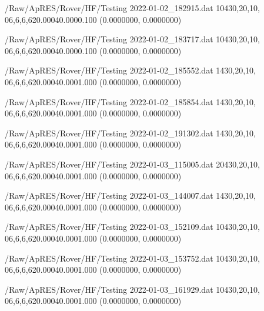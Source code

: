 \hfaprestable
{/Raw/ApRES/Rover/HF/Testing}%
{2022-01-02\_182915.dat}%
{10}{4}{30,20,10, 0}{6,6,6,6}{20.000}{40.000}{0.100}%
{ (0.0000000, 0.0000000)}%
{}%
{}%

\hfaprestable
{/Raw/ApRES/Rover/HF/Testing}%
{2022-01-02\_183717.dat}%
{10}{4}{30,20,10, 0}{6,6,6,6}{20.000}{40.000}{0.100}%
{ (0.0000000, 0.0000000)}%
{}%
{}%

\hfaprestable
{/Raw/ApRES/Rover/HF/Testing}%
{2022-01-02\_185552.dat}%
{1}{4}{30,20,10, 0}{6,6,6,6}{20.000}{40.000}{1.000}%
{ (0.0000000, 0.0000000)}%
{}%
{}%

\hfaprestable
{/Raw/ApRES/Rover/HF/Testing}%
{2022-01-02\_185854.dat}%
{1}{4}{30,20,10, 0}{6,6,6,6}{20.000}{40.000}{1.000}%
{ (0.0000000, 0.0000000)}%
{}%
{}%

\hfaprestable
{/Raw/ApRES/Rover/HF/Testing}%
{2022-01-02\_191302.dat}%
{1}{4}{30,20,10, 0}{6,6,6,6}{20.000}{40.000}{1.000}%
{ (0.0000000, 0.0000000)}%
{}%
{}%

\hfaprestable
{/Raw/ApRES/Rover/HF/Testing}%
{2022-01-03\_115005.dat}%
{20}{4}{30,20,10, 0}{6,6,6,6}{20.000}{40.000}{1.000}%
{ (0.0000000, 0.0000000)}%
{}%
{}%

\hfaprestable
{/Raw/ApRES/Rover/HF/Testing}%
{2022-01-03\_144007.dat}%
{1}{4}{30,20,10, 0}{6,6,6,6}{20.000}{40.000}{1.000}%
{ (0.0000000, 0.0000000)}%
{}%
{}%

\hfaprestable
{/Raw/ApRES/Rover/HF/Testing}%
{2022-01-03\_152109.dat}%
{10}{4}{30,20,10, 0}{6,6,6,6}{20.000}{40.000}{1.000}%
{ (0.0000000, 0.0000000)}%
{}%
{}%

\hfaprestable
{/Raw/ApRES/Rover/HF/Testing}%
{2022-01-03\_153752.dat}%
{10}{4}{30,20,10, 0}{6,6,6,6}{20.000}{40.000}{1.000}%
{ (0.0000000, 0.0000000)}%
{}%
{}%

\hfaprestable
{/Raw/ApRES/Rover/HF/Testing}%
{2022-01-03\_161929.dat}%
{10}{4}{30,20,10, 0}{6,6,6,6}{20.000}{40.000}{1.000}%
{ (0.0000000, 0.0000000)}%
{}%
{}%


